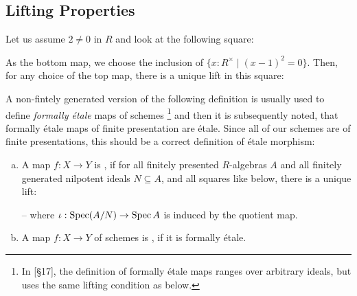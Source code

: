 
\subsection{Lifting Properties}

\begin{example}
  Let us assume $2\neq 0$ in $R$ and look at the following square:
  \begin{center}
  \end{center}
  As the bottom map, we choose the inclusion of $\{x:R^\times \mid (x-1)^2=0 \}$.
  Then, for any choice of the top map, there is a unique lift in this square:
  \begin{center}
  \end{center}
\end{example}

A non-fintely generated version of the following definition is usually used
to define \emph{formally étale} maps of schemes
\footnote{In \cite{EGAIV3}[§17], the definition of formally étale maps ranges over arbitrary ideals, but uses the same lifting condition as below.}
and then it is subsequently noted,
that formally étale maps of finite presentation are étale.
Since all of our schemes are of finite presentations, this should be a correct definition of étale morphism:

\begin{definition}
  \begin{enumerate}[(a)]
  \item   A map $f:X\to Y$ is ,
    if for all finitely presented $R$-algebras $A$ and all finitely generated nilpotent ideals $N\subseteq A$,
    and all squares like below, there is a unique lift:
    \begin{center}
    \end{center}
    -- where $\iota:\operatorname{Spec} (A/N)\to \operatorname{Spec} A$ is induced by the quotient map.
  \item A map $f:X\to Y$ of schemes is , if it is formally étale.
  \end{enumerate}
\end{definition}

